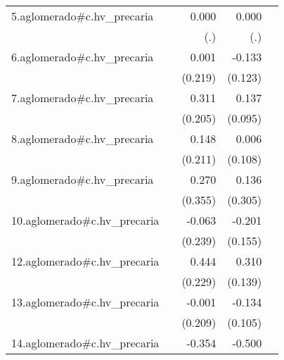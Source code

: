 {\begin{longtable}{l*{4}{D{.}{.}{-1}}}
\addlinespace
5.aglomerado#c.hv\_precaria&                     &       0.000         &       0.000         &                     \\
            &                     &         (.)         &         (.)         &                     \\
\addlinespace
6.aglomerado#c.hv\_precaria&                     &       0.001         &      -0.133         &                     \\
            &                     &     (0.219)         &     (0.123)         &                     \\
\addlinespace
7.aglomerado#c.hv\_precaria&                     &       0.311         &       0.137         &                     \\
            &                     &     (0.205)         &     (0.095)         &                     \\
\addlinespace
8.aglomerado#c.hv\_precaria&                     &       0.148         &       0.006         &                     \\
            &                     &     (0.211)         &     (0.108)         &                     \\
\addlinespace
9.aglomerado#c.hv\_precaria&                     &       0.270         &       0.136         &                     \\
            &                     &     (0.355)         &     (0.305)         &                     \\
\addlinespace
10.aglomerado#c.hv\_precaria&                     &      -0.063         &      -0.201         &                     \\
            &                     &     (0.239)         &     (0.155)         &                     \\
\addlinespace
12.aglomerado#c.hv\_precaria&                     &       0.444         &       0.310\sym{*}  &                     \\
            &                     &     (0.229)         &     (0.139)         &                     \\
\addlinespace
13.aglomerado#c.hv\_precaria&                     &      -0.001         &      -0.134         &                     \\
            &                     &     (0.209)         &     (0.105)         &                     \\
\addlinespace
14.aglomerado#c.hv\_precaria&                     &      -0.354         &      -0.500         &                     \\

\end{longtable}}
